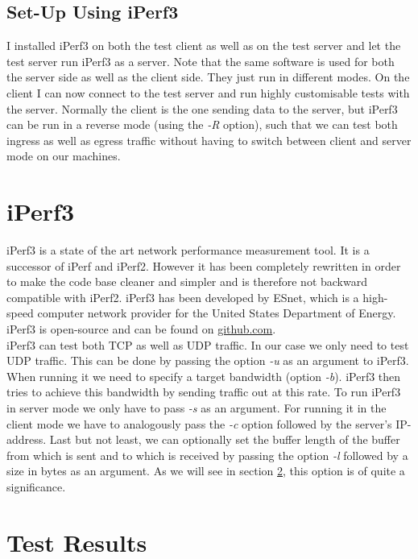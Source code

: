 \subsection{Set-Up Using iPerf3}

I installed iPerf3 on both the test client as well as on the test server and let the test server run iPerf3 as a server. Note that the same software is used for both the server side as well as the client side. They just run in different modes. On the client I can now connect to the test server and run highly customisable tests with the server. Normally the client is the one sending data to the server, but iPerf3 can be run in a reverse mode (using the \textit{-R} option), such that we can test both ingress as well as egress traffic without having to switch between client and server mode on our machines.

\section{iPerf3}

iPerf3 is a state of the art network performance measurement tool. It is a successor of iPerf and iPerf2. However it has been completely rewritten in order to make the code base cleaner and simpler and is therefore not backward compatible with iPerf2. iPerf3 has been developed by \ac{ESnet}, which is a high-speed computer network provider for the United States Department of Energy. iPerf3 is open-source and can be found on \href{https://github.com/esnet/iperf}{github.com}\cite{mah2018iperf3}.
\\
iPerf3 can test both \ac{TCP} as well as \acs{UDP} traffic. In our case we only need to test \acs{UDP} traffic. This can be done by passing the option \textit{-u} as an argument to iPerf3. When running it we need to specify a target bandwidth (option \textit{-b}). iPerf3 then tries to achieve this bandwidth by sending traffic out at this rate. To run iPerf3 in server mode we only have to pass \textit{-s} as an argument. For running it in the client mode we have to analogously pass the \textit{-c} option followed by the server's \acs{IP}-address. Last but not least, we can optionally set the buffer length of the buffer from which is sent and to which is received by passing the option \textit{-l} followed by a size in bytes as an argument. As we will see in section \ref{Test Results}, this option is of quite a significance.

\section{Test Results}\label{Test Results}

